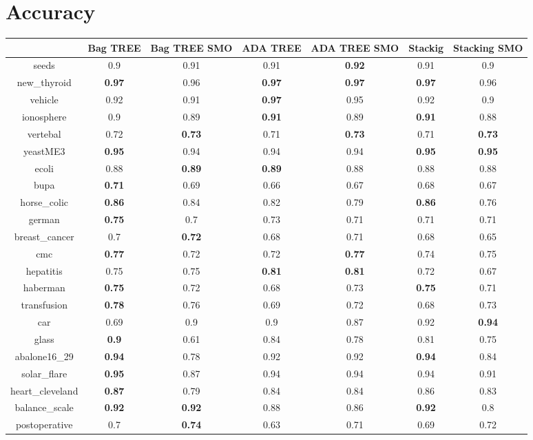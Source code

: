 \documentclass{article}%
\begin{document}
%
\normalsize%
\section*{Accuracy}%
\begin{tabular}{c|cccccc}%
&Bag TREE&Bag TREE SMO&ADA TREE&ADA TREE SMO&Stackig&Stacking SMO\\%
\hline%
seeds&0.9&0.91&0.91&\textbf{0.92}&0.91&0.9\\%
new\_thyroid&\textbf{0.97}&0.96&\textbf{0.97}&\textbf{0.97}&\textbf{0.97}&0.96\\%
vehicle&0.92&0.91&\textbf{0.97}&0.95&0.92&0.9\\%
ionosphere&0.9&0.89&\textbf{0.91}&0.89&\textbf{0.91}&0.88\\%
vertebal&0.72&\textbf{0.73}&0.71&\textbf{0.73}&0.71&\textbf{0.73}\\%
yeastME3&\textbf{0.95}&0.94&0.94&0.94&\textbf{0.95}&\textbf{0.95}\\%
ecoli&0.88&\textbf{0.89}&\textbf{0.89}&0.88&0.88&0.88\\%
bupa&\textbf{0.71}&0.69&0.66&0.67&0.68&0.67\\%
horse\_colic&\textbf{0.86}&0.84&0.82&0.79&\textbf{0.86}&0.76\\%
german&\textbf{0.75}&0.7&0.73&0.71&0.71&0.71\\%
breast\_cancer&0.7&\textbf{0.72}&0.68&0.71&0.68&0.65\\%
cmc&\textbf{0.77}&0.72&0.72&\textbf{0.77}&0.74&0.75\\%
hepatitis&0.75&0.75&\textbf{0.81}&\textbf{0.81}&0.72&0.67\\%
haberman&\textbf{0.75}&0.72&0.68&0.73&\textbf{0.75}&0.71\\%
transfusion&\textbf{0.78}&0.76&0.69&0.72&0.68&0.73\\%
car&0.69&0.9&0.9&0.87&0.92&\textbf{0.94}\\%
glass&\textbf{0.9}&0.61&0.84&0.78&0.81&0.75\\%
abalone16\_29&\textbf{0.94}&0.78&0.92&0.92&\textbf{0.94}&0.84\\%
solar\_flare&\textbf{0.95}&0.87&0.94&0.94&0.94&0.91\\%
heart\_cleveland&\textbf{0.87}&0.79&0.84&0.84&0.86&0.83\\%
balance\_scale&\textbf{0.92}&\textbf{0.92}&0.88&0.86&\textbf{0.92}&0.8\\%
postoperative&0.7&\textbf{0.74}&0.63&0.71&0.69&0.72\\%
\end{tabular}
\end{document}
